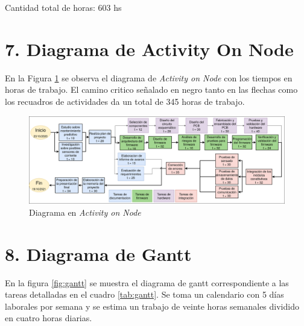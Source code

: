\documentclass[11pt]{charter}
\begin{document}
Cantidad total de horas: 603 hs


\section{7. Diagrama de Activity On Node}
\label{sec:AoN}

En la Figura \ref{fig:AoN} se observa el diagrama de \textit{Activity on Node} con los tiempos en horas de trabajo. El camino critico señalado en negro tanto en las flechas como los recuadros de actividades da un total de 345 horas de trabajo.

\begin{figure}[htpb]
\centering 
\includegraphics[width=1\textwidth]{./Figuras/AoN.png}
\caption{Diagrama en \textit{Activity on Node}}
\label{fig:AoN}
\end{figure}


\section{8. Diagrama de Gantt}
\label{sec:gantt}

En la figura \ref{fig:gantt} se muestra el diagrama de gantt correspondiente a las tareas detalladas en el cuadro \ref{tab:gantt}. Se toma un calendario con 5 días laborales por semana y se estima un trabajo de veinte horas semanales dividido en cuatro horas diarias.
\end{document}
